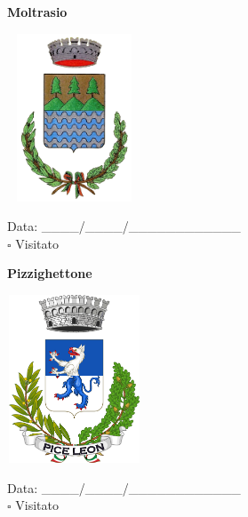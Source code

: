 \documentclass[a5paper,12pt]{article}
\begin{document}
\vspace{0.7cm}

\noindent
\begin{minipage}[t]{0.45\textwidth}
    \begin{center}
        \textbf{Moltrasio}
    \end{center}
    \vspace{-0.5cm} %
    \begin{center}
        \includegraphics[height= 5cm, width=4cm]{Lombardia/Stemma Moltrasio.png}
    \end{center}
    \vspace{-0.4cm} %
    \begin{flushleft}
        Data: \_\_\_\_/\_\_\_\_/\_\_\_\_\_\_\_\_\_\_\_\_ \\
        $\square$ Visitato
    \end{flushleft}
\end{minipage}
\hfill
\noindent
\begin{minipage}[t]{0.45\textwidth}
    \begin{center}
        \textbf{Pizzighettone}
    \end{center}
    \vspace{-0.5cm} %
    \begin{center}
        \includegraphics[height= 5cm, width=4cm]{Lombardia/Stemma Pizzighettone.png}
    \end{center}
    \vspace{-0.4cm} %
    \begin{flushleft}
        Data: \_\_\_\_/\_\_\_\_/\_\_\_\_\_\_\_\_\_\_\_\_ \\
        $\square$ Visitato
    \end{flushleft}
\end{minipage}
\end{document}
